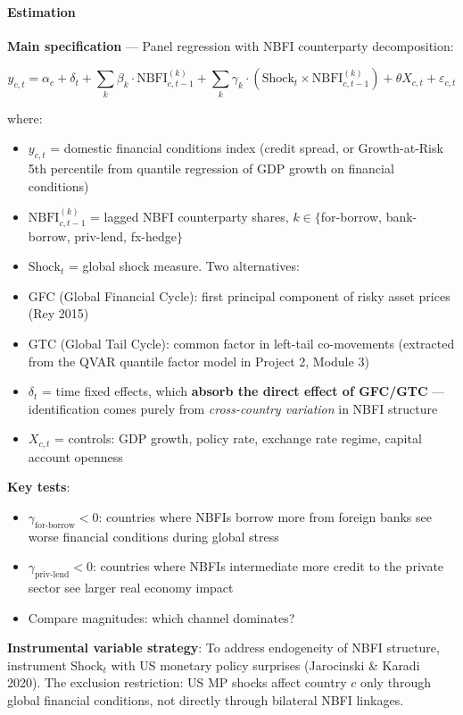 \documentclass[11pt,a4paper]{article}
\begin{document}
\paragraph{Estimation}

\textbf{Main specification} --- Panel regression with NBFI counterparty decomposition:

\[y_{c,t} = \alpha_c + \delta_t + \sum_{k} \beta_k \cdot \text{NBFI}_{c,t-1}^{(k)} + \sum_{k} \gamma_k \cdot (\text{Shock}_t \times \text{NBFI}_{c,t-1}^{(k)}) + \theta X_{c,t} + \varepsilon_{c,t}\]

where:
\begin{itemize}
\item $y_{c,t}$ = domestic financial conditions index (credit spread, or Growth-at-Risk 5th percentile from quantile regression of GDP growth on financial conditions)
\item $\text{NBFI}_{c,t-1}^{(k)}$ = lagged NBFI counterparty shares, $k \in \{$for-borrow, bank-borrow, priv-lend, fx-hedge$\}$
\item $\text{Shock}_t$ = global shock measure. Two alternatives:
\item GFC (Global Financial Cycle): first principal component of risky asset prices (Rey 2015)
\item GTC (Global Tail Cycle): common factor in left-tail co-movements (extracted from the QVAR quantile factor model in Project 2, Module 3)
\item $\delta_t$ = time fixed effects, which \textbf{absorb the direct effect of GFC/GTC} --- identification comes purely from \textit{cross-country variation} in NBFI structure
\item $X_{c,t}$ = controls: GDP growth, policy rate, exchange rate regime, capital account openness

\end{itemize}
\textbf{Key tests}:
\begin{itemize}
\item $\gamma_{\text{for-borrow}} < 0$: countries where NBFIs borrow more from foreign banks see worse financial conditions during global stress
\item $\gamma_{\text{priv-lend}} < 0$: countries where NBFIs intermediate more credit to the private sector see larger real economy impact
\item Compare magnitudes: which channel dominates?

\end{itemize}
\textbf{Instrumental variable strategy}: To address endogeneity of NBFI structure, instrument $\text{Shock}_t$ with US monetary policy surprises (Jarocinski \& Karadi 2020). The exclusion restriction: US MP shocks affect country $c$ only through global financial conditions, not directly through bilateral NBFI linkages.
\end{document}
